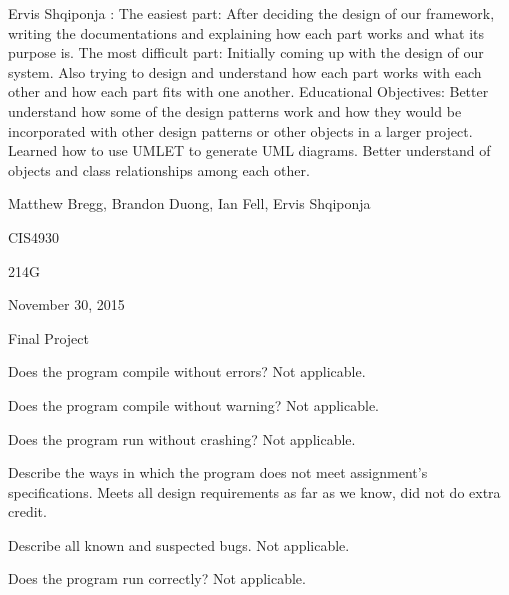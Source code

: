 \documentclass{article}
\begin{document}
\begin{list}{Learning Experience, }{}
\item Ervis Shqiponja : The easiest part: After deciding the design of our framework, writing the documentations and explaining how each part works and what its purpose is.
The most difficult part: Initially coming up with the design of our system. Also trying to design and understand how each part works with each other and how each part fits with one another.
Educational Objectives: Better understand how some of the design patterns work and how they would be incorporated with other design patterns or other objects in a larger project. Learned how to use UMLET to generate UML diagrams. Better understand of objects and class relationships among each other.

\end{list}
\newpage

\begin{flushright}
Matthew Bregg, Brandon Duong,  Ian Fell, Ervis Shqiponja
\end{flushright}
\begin{flushright}
CIS4930
\end{flushright}
\begin{flushright}
214G
\end{flushright}
\begin{flushright}
November 30, 2015
\end{flushright}
\begin{flushright}
Final Project
\end{flushright}


\begin{list}{*}{}
\item Does the program compile without errors? Not applicable.
\item Does the program compile without warning? Not applicable.
\item Does the program run without crashing? Not applicable.
\item Describe the ways in which the program does not meet assignment's specifications. Meets all design requirements as far as we know, did not do extra credit.
\item Describe all known and suspected bugs. Not applicable.
\item Does the program run correctly? Not applicable.
\end{list}
\end{document}
